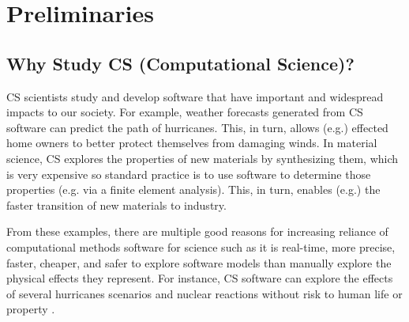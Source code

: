 \documentclass[sigconf,review,anonymous]{acmart}
\begin{document}

 
 

\section{Preliminaries  } 

\subsection{Why Study CS (Computational Science)?}

CS scientists study and develop software that have important and widespread impacts to our society.  
For example, weather forecasts generated from CS
software can  predict the path of hurricanes. This, in turn,
allows (e.g.) effected home owners to better protect themselves from
damaging winds. In material science, CS explores the properties
of new materials by synthesizing them, which is very expensive so standard practice is to use software to determine
those properties (e.g. via a finite element analysis). This, in turn, enables (e.g.) the faster transition of new materials to industry.

From these examples, there are multiple good reasons for increasing reliance of computational methods software for science such as it is real-time, more precise, faster, cheaper, and safer to 
explore software models than manually explore the physical effects they represent. For instance, CS software can explore the effects of several 
hurricanes 
scenarios and nuclear reactions without risk to  human  life
or property \cite{heaton15_lit}. 
\end{document}
